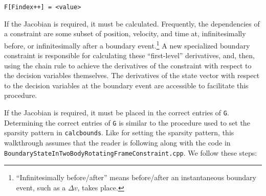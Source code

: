 \documentclass[11pt]{article}
\begin{document}
\texttt{F[Findex++] = <value>}

If the Jacobian is required, it must be calculated. Frequently, the dependencies of a constraint are some subset of position, velocity, and time at, infinitesimally before, or infinitesimally after a boundary event.\footnote{``Infinitesimally before/after'' means before/after an instantaneous boundary event, such as a $\Delta v$, takes place.} A new specialized boundary constraint is responsible for calculating these ``first-level'' derivatives, and, then, using the chain rule to achieve the derivatives of the constraint with respect to the decision variables themselves. The derivatives of the state vector with respect to the decision variables at the boundary event are accessible to facilitate this procedure.

If the Jacobian is required, it must be placed in the correct entries of \texttt{G}. Determining the correct entries of \texttt{G} is similar to the procedure used to set the sparsity pattern in \texttt{calcbounds}. Like for setting the sparsity pattern, this walkthrough assumes that the reader is following along with the code in \texttt{BoundaryStateInTwoBodyRotatingFrameConstraint.cpp}. We follow these steps:
\end{document}
